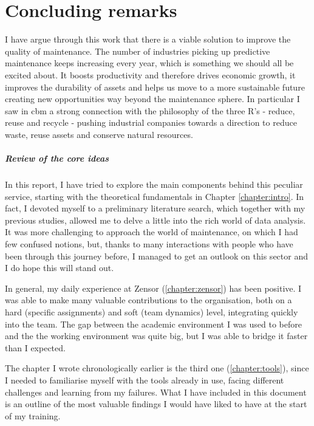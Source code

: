 \chapter{Concluding remarks}
I have argue through this work that there is a viable solution to improve the quality of maintenance. %
The number of industries picking up predictive maintenance keeps increasing every year, which is something we should all be excited about. 
It boosts productivity and therefore drives economic growth, it improves the durability of assets and helps us move to a more sustainable future creating new opportunities way beyond the maintenance sphere.
In particular I saw in \acl{cbm} a strong connection with the philosophy of the three R's - reduce, reuse and recycle - pushing industrial companies towards a direction to reduce waste, reuse assets and conserve natural resources. 

\paragraph{Review of the core ideas}
In this report, I have tried to explore the main components behind this peculiar service, starting with the theoretical fundamentals in Chapter \ref{chapter:intro}. 
In fact, I devoted myself to a preliminary literature search, which together with my previous studies, allowed me to delve a little into the rich world of data analysis. 
It was more challenging to approach the world of maintenance, on which I had few confused notions, but, thanks to many interactions with people who have been through this journey before, 
I managed to get an outlook on this sector and I do hope this will stand out.

In general, my daily experience at Zensor (\ref{chapter:zensor}) has been positive. I was able to make many valuable contributions to the organisation, both on a hard (specific assignments) and soft (team dynamics) level, integrating quickly into the team. 
The gap between the academic environment I was used to before and the the working environment was quite big, but I was able to bridge it faster than I expected.

The chapter I wrote chronologically earlier is the third one (\ref{chapter:tools}), since I needed to familiarise myself with the tools already in use, facing different challenges and learning from my failures.
What I have included in this document is an outline of the most valuable findings I would have liked to have at the start of my training.

